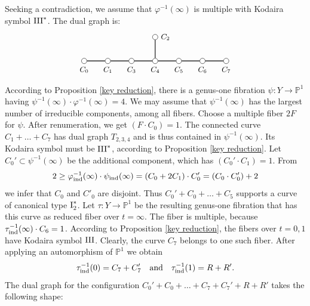 \documentclass[oneside, 12pt]{amsart}
\theoremstyle{definition}
\theoremstyle{remark}
\newcommand{\PP}{\mathbb{P}}
\newcommand{\I}{\text{\rm I}}
\newcommand{\III}{\text{\rm III}}
\newcommand{\quadand}{\quad\text{and}\quad}
\newcommand{\ra}{\rightarrow}
\newcommand{\ind}{\text{\rm ind}}
\begin{document}
\proof
Seeking a contradiction, we assume   that $\varphi^{-1}(\infty)$
is multiple with Kodaira symbol $\III^*$. The dual graph is:
\begin{equation}
\label{dual graph III*}
\begin{gathered}
\begin{tikzpicture}
[node distance=1cm, font=\small]
\tikzstyle{vertex}=[circle, draw, fill=white, inner sep=0mm, minimum size=1.5ex]
\node[vertex]	(C0)  	at (1,0) [label=below:{$C_0$}] {};
\node[vertex]	(C1)	[right of=C0,  label=below:{$C_1$}]	{};
\node[vertex]	(C3)	[right of=C1,  label=below:{$C_3$}]	{};
\node[vertex]	(C4)	[right of=C3,  label=below:{$C_4$}]	{};
\node[vertex]	(C5)	[right of=C4,  label=below:{$C_5$}]	{};
\node[vertex]	(C6)	[right of=C5,  label=below:{$C_6$}]	{};
\node[vertex]	(C7)	[right of=C6,  label=below:{$C_7$}]	{};
\node[vertex]	(C2)	[above of=C4,  label=right:{$C_2$}]	{};
 
\draw[thick]    (C0)--(C1)--(C3)--(C4)-- (C5)--(C6)--(C7);
\draw[thick]    (C2)--(C4);
\end{tikzpicture}
\end{gathered}
\end{equation}
According to Proposition \ref{key reduction}, there is a genus-one fibration $\psi:Y\ra\PP^1$ having $\psi^{-1}(\infty)\cdot\varphi^{-1}(\infty)=4$.
We may assume that  $\psi^{-1}(\infty)$ has the largest number of irreducible components, among all fibers.
Choose a multiple fiber  $2F$  for $\psi$. After renumeration, we get $(F\cdot C_0)=1$.  
The connected curve $C_1+\ldots+C_7$ has dual graph $T_{2,3,4}$ and is thus contained in $\psi^{-1}(\infty)$. Its Kodaira
symbol must be $\III^*$, according to Proposition \ref{key reduction}. Let $C_0'\subset\psi^{-1}(\infty)$ be 
the additional component, which has $(C_0'\cdot C_1)=1$. From
$$
2\geq \varphi^{-1}_\ind(\infty)\cdot \psi_\ind(\infty) = (C_0+2C_1)\cdot C'_0 = (C_0\cdot C'_0) + 2
$$
we infer that $C_0$ and $C'_0$ are disjoint.
Thus  $C_0'+C_0+\ldots+ C_5$ supports a curve of canonical type $\I_2^*$.
Let $\tau:Y\ra\PP^1$ be the resulting genus-one fibration that has this curve as reduced fiber over $t=\infty$.
The fiber is multiple, because $\tau^{-1}_\ind(\infty)\cdot C_6=1$.
According to Proposition \ref{key reduction}, 
the fibers over $t=0,1$ have Kodaira symbol $\III$. Clearly, the curve $C_7$ belongs to one such fiber.
After applying an automorphism of $\PP^1$ we obtain
$$
\tau^{-1}_\ind(0)= C_7+C_7'\quadand \tau^{-1}_\ind(1) = R+R'.
$$
The dual graph for the configuration $C_0'+C_0+\ldots+C_7+C_7'+R+R'$ takes the following shape:
\end{document}

